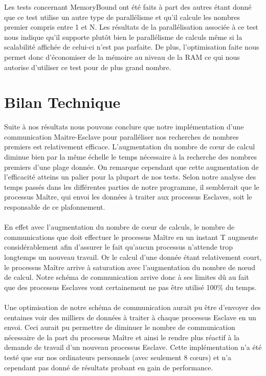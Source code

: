 	Les tests concernant MemoryBound ont été faits à part des autres étant donné que ce test utilise un autre type de parallélisme et qu'il calcule les nombres premier compris entre 1 et N. Les résultats de la parallélisation associée à ce test nous indique qu'il supporte plutôt bien le parallélisme de calculs même si la scalabilité affichée de celui-ci n'est pas parfaite. De plus, l'optimisation faite nous permet donc d'économiser de la mémoire au niveau de la RAM ce qui nous autorise d'utiliser ce test pour de plus grand nombre.
	\section{Bilan Technique}	
		
Suite à nos résultats nous pouvons conclure que notre implémentation d'une communication Maitre-Esclave pour paralléliser nos recherches de nombres premiers est relativement efficace.
L'augmentation du nombre de cœur de calcul diminue bien par la même échelle le temps nécessaire à la recherche des nombres premiers d'une plage donnée.
On remarque cependant que cette augmentation de l'efficacité atteins un palier pour la plupart de nos tests. Selon notre analyse des temps passés dans les différentes parties de notre programme, il semblerait que le processus Maître, qui envoi les données à traiter aux processus Esclaves, soit le responsable de ce plafonnement.
\paragraph{}En effet avec l'augmentation du nombre de cœur de calculs, le nombre de communications que doit effectuer le processus Maître en un instant T augmente considérablement afin d'assurer le fait qu'aucun processus n'attende trop longtemps un nouveau travail.
Or le calcul d'une donnée étant relativement court, le processus Maître arrive à saturation avec l'augmentation du nombre de nœud de calcul.
Notre schéma de communication arrive donc à ses limites dû au fait que des processus Esclaves vont certainement ne pas être utilisé 100\% du temps.

\paragraph{}Une optimisation de notre schéma de communication aurait pu être d'envoyer des centaines voir des milliers de données à traiter à chaque processus Esclave en un envoi.
Ceci aurait pu permettre de diminuer le nombre de communication nécessaire de la part du processus Maître et ainsi le rendre plus réactif à la demande de travail d'un nouveau processus Esclave.
Cette implémentation n'a été testé que sur nos ordinateurs personnels (avec seulement 8 cœurs) et n'a cependant pas donné de résultats probant en gain de performance.

